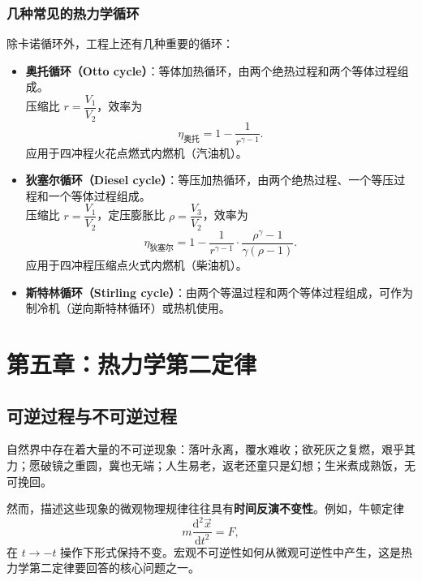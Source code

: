 \documentclass[UTF8]{ctexart}
\theoremstyle{definition}
\begin{document}
\subsubsection*{几种常见的热力学循环}

除卡诺循环外，工程上还有几种重要的循环：

\begin{itemize}
\item \textbf{奥托循环（Otto cycle）}：等体加热循环，由两个绝热过程和两个等体过程组成。\\
压缩比 $r=\dfrac{V_1}{V_2}$，效率为
\begin{equation}
\boxed{\eta_{\text{奥托}} = 1 - \frac{1}{r^{\gamma-1}}}.
\end{equation}
应用于四冲程火花点燃式内燃机（汽油机）。

\item \textbf{狄塞尔循环（Diesel cycle）}：等压加热循环，由两个绝热过程、一个等压过程和一个等体过程组成。\\
压缩比 $r=\dfrac{V_1}{V_2}$，定压膨胀比 $\rho=\dfrac{V_3}{V_2}$，效率为
\begin{equation}
\boxed{\eta_{\text{狄塞尔}} = 1 - \frac{1}{r^{\gamma-1}}\cdot\frac{\rho^{\gamma}-1}{\gamma(\rho-1)}}.
\end{equation}
应用于四冲程压缩点火式内燃机（柴油机）。

\item \textbf{斯特林循环（Stirling cycle）}：由两个等温过程和两个等体过程组成，可作为制冷机（逆向斯特林循环）或热机使用。
\end{itemize}

\newpage
\section{第五章：热力学第二定律}

\subsection{可逆过程与不可逆过程}

自然界中存在着大量的不可逆现象：落叶永离，覆水难收；欲死灰之复燃，艰乎其力；愿破镜之重圆，冀也无端；人生易老，返老还童只是幻想；生米煮成熟饭，无可挽回。

然而，描述这些现象的微观物理规律往往具有\textbf{时间反演不变性}。例如，牛顿定律
\begin{equation}
m\frac{\mathrm{d}^2\vec{x}}{\mathrm{d}t^2}=F,
\end{equation}
在 $t\to -t$ 操作下形式保持不变。宏观不可逆性如何从微观可逆性中产生，这是热力学第二定律要回答的核心问题之一。
\end{document}
